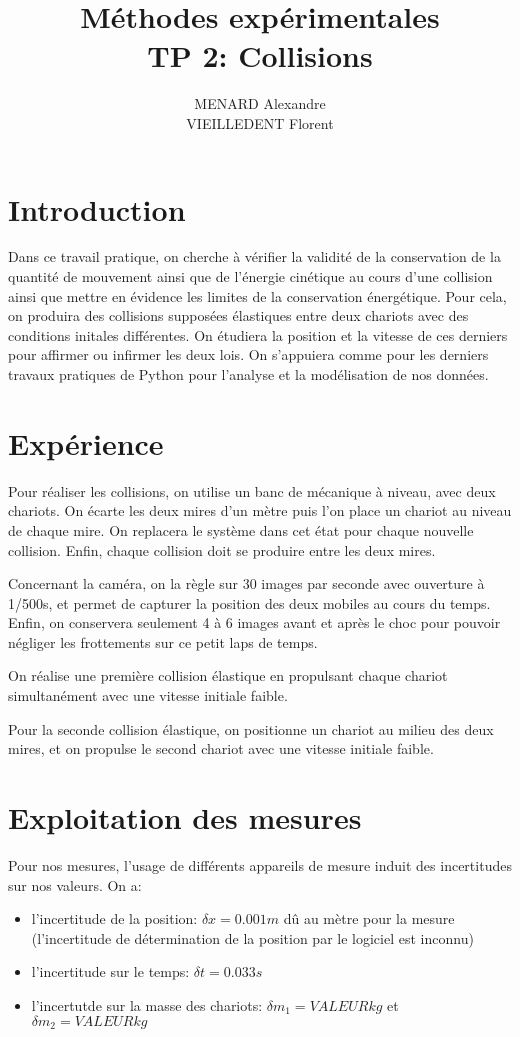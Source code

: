 \documentclass[12pt]{article}
\title{\textbf{Méthodes expérimentales} \\ TP 2: Collisions}
\author{MENARD Alexandre \\ VIEILLEDENT Florent}
\begin{document}
\maketitle

\section*{Introduction}
Dans ce travail pratique, on cherche à vérifier la validité de la conservation de la quantité de mouvement 
ainsi que de l'énergie cinétique au cours d'une collision ainsi que mettre en évidence les limites de la conservation énergétique.
Pour cela, on produira des collisions supposées élastiques entre deux chariots avec des conditions initales différentes. On étudiera 
la position et la vitesse de ces derniers pour affirmer ou infirmer
les deux lois. On s'appuiera comme pour les derniers travaux pratiques de Python pour l'analyse et la modélisation de nos données.


\newpage
\section{Expérience}
Pour réaliser les collisions, on utilise un banc de mécanique à niveau, avec deux chariots. On écarte les deux mires 
d'un mètre puis l'on place un chariot au niveau de chaque mire. On replacera le système dans cet état pour chaque nouvelle collision.
Enfin, chaque collision doit se produire entre les deux mires. 

Concernant la caméra, on la règle sur 30 images par seconde avec ouverture à 1/500s, et permet de capturer la position des deux mobiles au cours du temps.
Enfin, on conservera seulement 4 à 6 images avant et après le choc pour pouvoir négliger les frottements sur ce petit laps de temps.

On réalise une première collision élastique en propulsant chaque chariot simultanément avec une vitesse initiale faible.

Pour la seconde collision élastique, on positionne un chariot au milieu des deux mires, et on propulse le second chariot avec une vitesse initiale faible.

\section{Exploitation des mesures}
Pour nos mesures, l'usage de différents appareils de mesure induit des incertitudes sur nos valeurs. On a:
\begin{itemize}
    \item l'incertitude de la position: $\delta x = 0.001m$ dû au mètre pour la mesure (l'incertitude de détermination de la position par le logiciel est inconnu)
    \item l'incertitude sur le temps: $\delta t = 0.033s$
    \item l'incertutde sur la masse des chariots: $\delta m_1 = VALEUR kg$ et $\delta m_2 = VALEUR kg$
\end{itemize}
\end{document}

